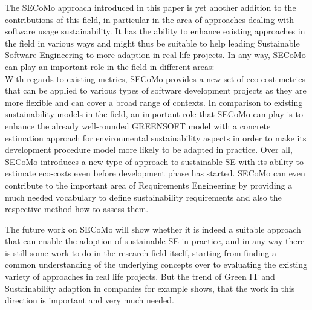 \documentclass[oribibl]{llncs}
\begin{document}
The SECoMo approach introduced in this paper is yet another addition to the contributions of this field, in particular in the area of approaches dealing with software usage sustainability. %
It has the ability to enhance existing approaches in the field in various ways and might thus be suitable to help leading Sustainable Software Engineering to more adaption in real life projects. In any way, SECoMo can play an important role in the field in different areas:\\
With regards to existing metrics, SECoMo provides a new set of eco-cost metrics that can be applied to various types of software development projects as they are more flexible and can cover a broad range of contexts. In comparison to existing sustainability models in the field, an important role that SECoMo can play is to enhance the already well-rounded GREENSOFT model with a concrete estimation approach for environmental sustainability aspects in order to make its development procedure model more likely to be adapted in practice. Over all, SECoMo introduces a new type of approach to sustainable SE with its ability to estimate eco-costs even before development phase has started. SECoMo can even contribute to the important area of Requirements Engineering by providing a much needed vocabulary to define sustainability requirements and also the respective method how to assess them. %

The future work on SECoMo will show whether it is indeed a suitable approach that can enable the adoption of sustainable SE in practice, and in any way there is still some work to do in the research field itself, starting from finding a common understanding of the underlying concepts over to evaluating the existing variety of approaches in real life projects. But the trend of Green IT and Sustainability adaption in companies for example shows, that the work in this direction is important and very much needed.
\end{document}
